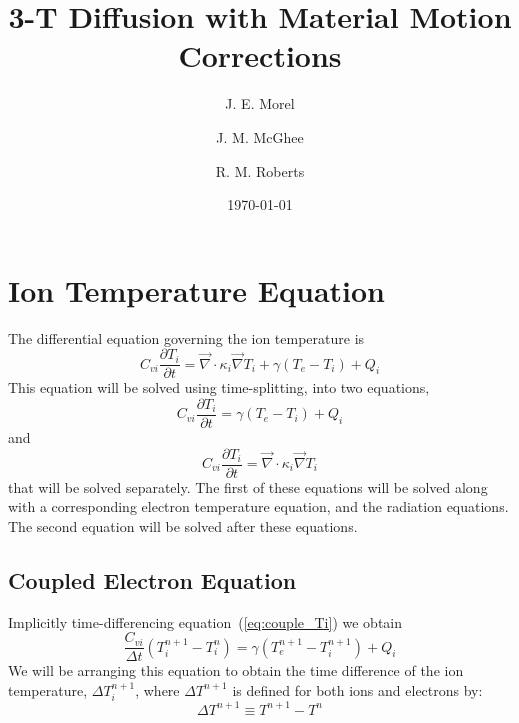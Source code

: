 \documentclass{article}
\newcommand{\partl}[2]{\ensuremath{\frac{\partial{#1}}{\partial{#2}}}}\newcommand{\del}{\ensuremath{\vec{\nabla}}}
\newcommand{\dt}{\ensuremath{\Delta t}}
\newcommand{\cviOdt}{\ensuremath{\frac{C_{vi}}{\dt}}}
\begin{document}
\title{3-T Diffusion with Material Motion Corrections}
\author{J. E. Morel \and J. M. McGhee \and R. M. Roberts}
\date{\today}

\maketitle

\newpage

\section{Ion Temperature Equation}

The differential equation governing the ion temperature is
\begin{equation}
	C_{vi} \partl{T_{i}}{t} = \del \cdot \kappa_{i} \del T_{i}
					+ \gamma (T_{e}-T_{i}) + Q_{i}
\end{equation}
This equation will be solved using time-splitting, into two equations,
\begin{equation}
	C_{vi} \partl{T_{i}}{t} = \gamma (T_{e}-T_{i}) + Q_{i}
\label{eq:couple_Ti}
\end{equation}
and
\begin{equation}
	C_{vi} \partl{T_{i}}{t} = \del \cdot \kappa_{i} \del T_{i}
\label{eq:conduction_Ti}
\end{equation}
that will be solved separately.
The first of these equations will be solved along with a corresponding
electron temperature equation, and the radiation equations.
The second equation will be solved after these equations.

\subsection{Coupled Electron Equation}

Implicitly time-differencing equation~(\ref{eq:couple_Ti}) we obtain
\begin{equation}
	\cviOdt ( T_{i}^{n+1}-T_{i}^{n}) =
		 \gamma (T_{e}^{n+1}-T_{i}^{n+1}) + Q_{i}
\end{equation}
We will be arranging this equation to obtain the time difference of
the ion temperature, $\Delta T_{i}^{n+1}$,
where $\Delta T^{n+1}$ is defined for both ions and electrons by:
\begin{equation}
	\Delta T^{n+1} \equiv T^{n+1} - T^{n}
\end{equation}
\end{document}
